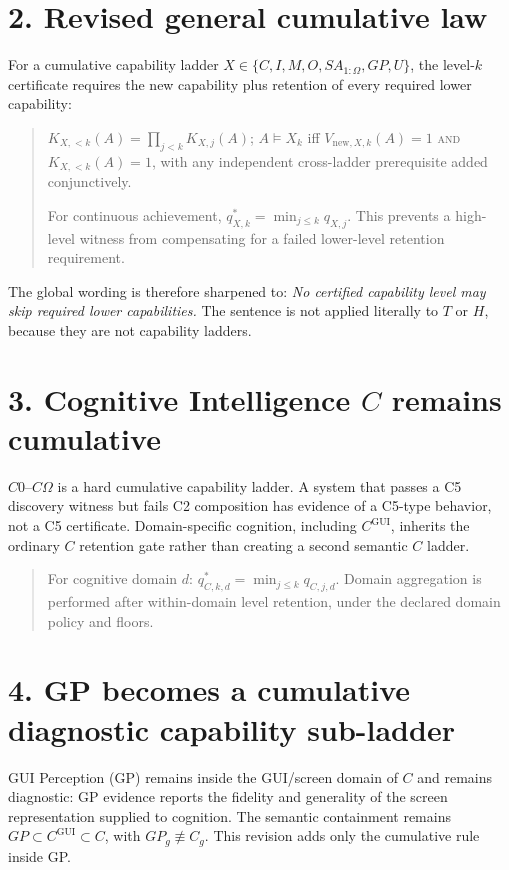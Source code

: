 \documentclass[11pt]{article}
\begin{document}
\section*{2. Revised general cumulative law}

For a cumulative capability ladder $X \in \{C, I, M, O, SA_{1:\Omega}, GP, U\}$, the level-$k$ certificate requires the new capability plus retention of every required lower capability:

\begin{quote}
$K_{X,<k}(A) = \prod_{j<k} K_{X,j}(A)$; $A \models X_k$ iff $V_{\mathrm{new},X,k}(A) = 1$ \textsc{and} $K_{X,<k}(A) = 1$, with any independent cross-ladder prerequisite added conjunctively.

For continuous achievement, $q^{*}_{X,k} = \min_{j \le k} q_{X,j}$. This prevents a high-level witness from compensating for a failed lower-level retention requirement.
\end{quote}

The global wording is therefore sharpened to: \emph{No certified capability level may skip required lower capabilities.} The sentence is not applied literally to $T$ or $H$, because they are not capability ladders.

\section*{3. Cognitive Intelligence $C$ remains cumulative}

$C0$--$C\Omega$ is a hard cumulative capability ladder. A system that passes a C5 discovery witness but fails C2 composition has evidence of a C5-type behavior, not a C5 certificate. Domain-specific cognition, including $C^{\mathrm{GUI}}$, inherits the ordinary $C$ retention gate rather than creating a second semantic $C$ ladder.

\begin{quote}
For cognitive domain $d$: $q^{*}_{C,k,d} = \min_{j \le k} q_{C,j,d}$. Domain aggregation is performed after within-domain level retention, under the declared domain policy and floors.
\end{quote}

\section*{4. GP becomes a cumulative diagnostic capability sub-ladder}

GUI Perception (GP) remains inside the GUI/screen domain of $C$ and remains diagnostic: GP evidence reports the fidelity and generality of the screen representation supplied to cognition. The semantic containment remains $GP \subset C^{\mathrm{GUI}} \subset C$, with $GP_g \not\equiv C_g$. This revision adds only the cumulative rule inside GP.
\end{document}
